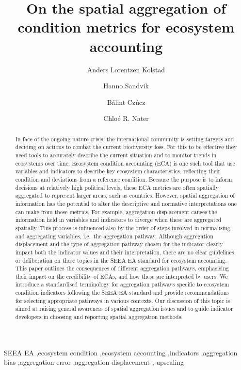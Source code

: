 \documentclass[
  authoryear,
  preprint,
  3p]{elsarticle}
\begin{document}
\begin{frontmatter}
\title{On the spatial aggregation of condition metrics for ecosystem
accounting}
\author[1]{Anders Lorentzen Kolstad%
%
}
\author[1]{Hanno Sandvik%
%
}
\author[1]{Bálint Czúcz%
%
}
\author[1]{Chloé R. Nater%
%
}






        
\begin{abstract}
In face of the ongoing nature crisis, the international community is
setting targets and deciding on actions to combat the current
biodiversity loss. For this to be effective they need tools to
accurately describe the current situation and to monitor trends in
ecosystems over time. Ecosystem condition accounting (ECA) is one such
tool that use variables and indicators to describe key ecosystem
characteristics, reflecting their condition and deviations from a
reference condition. Because the purpose is to inform decisions at
relatively high political levels, these ECA metrics are often spatially
aggregated to represent larger areas, such as countries. However,
spatial aggregation of information has the potential to alter the
descriptive and normative interpretations one can make from these
metrics. For example, aggregation displacement causes the information
held in variables and indicators to diverge when these are aggregated
spatially. This process is influenced also by the order of steps
involved in normalising and aggregating variables, i.e.~the aggregation
pathway. Although aggregation displacement and the type of aggregation
pathway chosen for the indicator clearly impact both the indicator
values and their interpretation, there are no clear guidelines or
deliberation on these topics in the SEEA EA standard for ecosystem
accounting. This paper outlines the consequences of different
aggregation pathways, emphasising their impact on the credibility of
ECAs, and how these are interpreted by users. We introduce a
standardised terminology for aggregation pathways specific to ecosystem
condition indicators following the SEEA EA standard and provide
recommendations for selecting appropriate pathways in various contexts.
Our discussion of this topic is aimed at raising general awareness of
spatial aggregation issues and to guide indicator developers in choosing
and reporting spatial aggregation methods.
\end{abstract}





\begin{keyword}
    SEEA EA \sep ecosystem condition \sep ecosystem
accounting \sep indicators \sep aggregation bias \sep aggregation
error \sep aggregation displacement \sep 
    upscaling
\end{keyword}
\end{frontmatter}
\end{document}

